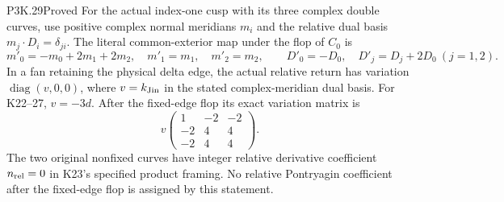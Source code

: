 \begin{statement}{P3K.29}{Proved}
For the actual index-one cusp with its three complex double curves,
use positive complex normal meridians \(m_i\) and the relative dual
basis \(m_j\cdot D_i=\delta_{ji}\). The literal common-exterior map
under the flop of \(C_0\) is
\[
 m'_0=-m_0+2m_1+2m_2,\quad m'_1=m_1,\quad m'_2=m_2,
 \qquad D'_0=-D_0,\quad D'_j=D_j+2D_0\ (j=1,2).
\]
In a fan retaining the physical delta edge, the actual relative
return has variation \(\operatorname{diag}(v,0,0)\), where
\(v=k_{\rm Jin}\) in the stated complex-meridian dual basis.
For K22--27, \(v=-3d\). After the fixed-edge flop its exact
variation matrix is
\[
 v\begin{pmatrix}1&-2&-2\\-2&4&4\\-2&4&4\end{pmatrix}.
\]
The two original nonfixed curves have integer relative derivative
coefficient \(n_{\rm rel}=0\) in K23's specified product framing.
No relative Pontryagin coefficient after the fixed-edge flop is
assigned by this statement.
\end{statement}
